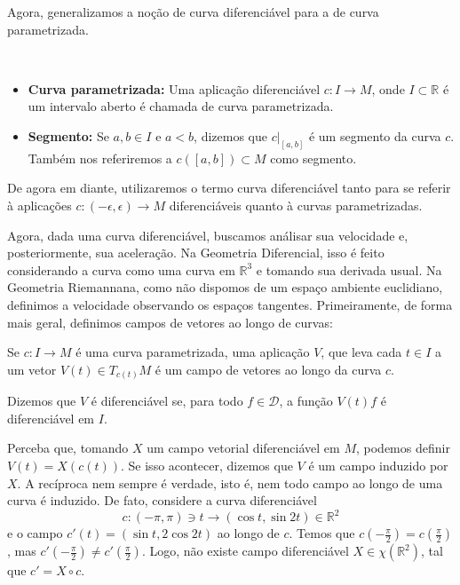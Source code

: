 Agora, generalizamos a noção de curva diferenciável para a de curva parametrizada.
\begin{definition}
    \label{loc:2.8_:_def_3_:_curva_parametrizada.definição}
    $ $
    \begin{itemize}
        \item \textbf{Curva parametrizada:} Uma aplicação diferenciável $c:I\to M$, onde $I \subset \mathbb{R}$ é um intervalo aberto é chamada de curva parametrizada.
        \item \textbf{Segmento:} Se $a,b \in I$ e $a <b$, dizemos que $c|_{[a,b]}$ é um segmento da curva $c$. Também nos referiremos a $c([a,b])\subset M$ como segmento.
    \end{itemize}
\end{definition}
De agora em diante, utilizaremos o termo curva diferenciável tanto para se referir à aplicações $c:(-\epsilon, \epsilon)\to M$ diferenciáveis quanto à curvas parametrizadas.

Agora, dada uma curva diferenciável, buscamos análisar sua velocidade e, posteriormente, sua aceleração. Na Geometria Diferencial, isso é feito considerando a curva como uma curva em $\mathbb{R}^{3}$ e tomando sua derivada usual. Na Geometria Riemannana, como não dispomos de um espaço ambiente euclidiano, definimos a velocidade observando os espaços tangentes. Primeiramente, de forma mais geral, definimos campos de vetores ao longo de curvas:
\begin{definition}
    \label{loc:2.9_:_def_4_:_campo_ao_longo_de_uma_curva}
    Se $c:I\to M$ é uma curva parametrizada, uma aplicação $V$, que leva cada $t \in I$ a um vetor $V(t) \in T_{c(t)}M$ é um campo de vetores ao longo da curva $c$.

    Dizemos que $V$ é diferenciável se, para todo $f \in \mathcal{D}$, a função $V(t)f$ é diferenciável em $I$.
\end{definition}
Perceba que, tomando $X$ um campo vetorial diferenciável em $M$, podemos definir $V(t)=X(c(t))$. Se isso acontecer, dizemos que $V$ é um campo induzido por $X$. A recíproca nem sempre é verdade, isto é, nem todo campo ao longo de uma curva é induzido. De fato, considere a curva diferenciável
\begin{equation*}
    c:(-\pi,\pi) \ni t \to (\cos t,\sin2t)\in \mathbb{R}^{2}
\end{equation*}
e o campo $c'(t)=(\sin t, 2\cos2t)$ ao longo de $c$.
Temos que $c\left( -\frac{\pi}{2} \right)=c\left( \frac{\pi}{2} \right)$, mas $c'\left(-\frac{\pi}{2} \right)\neq c'\left( \frac{\pi}{2} \right)$. Logo, não existe campo diferenciável $X \in \chi (\mathbb{R}^{2})$, tal que $c'=X\circ c$.

